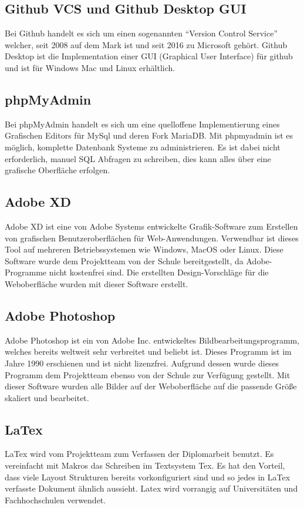 \subsection{Github VCS und Github Desktop GUI}
Bei Github handelt es sich um einen sogenannten “Version Control Service” welcher, seit 2008 auf dem Mark ist und seit 2016 zu Microsoft gehört. Github Desktop ist die Implementation einer GUI (Graphical User Interface) für github und ist für Windows Mac und Linux erhältlich.

\newpage
\subsection{ phpMyAdmin}
Bei phpMyAdmin handelt es sich um eine quelloffene Implementierung eines Grafischen Editors für MySql und deren Fork MariaDB. Mit phpmyadmin ist es möglich, komplette Datenbank Systeme zu administrieren. Es ist dabei nicht erforderlich, manuel SQL Abfragen zu schreiben, dies kann alles über eine grafische Oberfläche erfolgen.  
\subsection{Adobe XD}
Adobe XD ist eine von Adobe Systems entwickelte Grafik-Software zum Erstellen von grafischen Benutzeroberflächen für Web-Anwendungen. Verwendbar ist dieses Tool auf mehreren Betriebssystemen wie Windows, MacOS oder Linux. Diese Software wurde dem Projektteam von der Schule bereitgestellt, da Adobe-Programme nicht kostenfrei sind. Die erstellten Design-Vorschläge für die Weboberfläche wurden mit dieser Software erstellt. 


\subsection{Adobe Photoshop}
Adobe Photoshop ist ein von Adobe Inc. entwickeltes Bildbearbeitungsprogramm, welches bereits weltweit sehr verbreitet und beliebt ist. Dieses Programm ist im Jahre 1990 erschienen und ist nicht lizenzfrei. Aufgrund dessen wurde dieses Programm dem Projektteam ebenso von der Schule zur Verfügung gestellt. Mit dieser Software wurden alle Bilder auf der Weboberfläche auf die passende Größe skaliert und bearbeitet. 

\subsection{LaTex}
LaTex wird vom Projektteam zum Verfassen der Diplomarbeit benutzt. Es vereinfacht mit Makros das Schreiben im Textsystem Tex. Es hat den Vorteil, dass viele Layout Strukturen bereits vorkonfiguriert sind und so jedes in LaTex verfasste Dokument ähnlich aussieht. Latex wird vorrangig auf Universitäten und Fachhochschulen verwendet.

